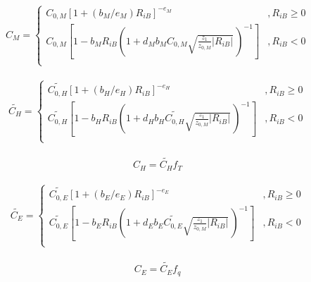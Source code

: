 \begin{eqnarray}
    C_M = \left\{
      \begin{array}{lr}
      C_{0,M} [ 1 + (b_M/e_M)  R_{iB} ]^{-e_M}
            &,
          R_{iB} \geq 0 \\
      C_{0,M} \left[ 1 - b_M R_{iB} \left( 1+ d_M b_M C_{0,M}
                                  \sqrt{\frac{z_1}{z_{0,M}}| R_{iB}|} \,
                                  \right)^{-1} \right]     
          &,
          R_{iB} < 0 \\
      \end{array} \right.
\end{eqnarray}

\begin{eqnarray}
    \widetilde{C_H} = \left\{
      \begin{array}{lr}
      \widetilde{C_{0,H}} [ 1 + (b_H/e_H) R_{iB} ]^{-e_H}
            &,
          R_{iB} \geq 0 \\
      \widetilde{C_{0,H}} \left[ 1 - b_H R_{iB}
                                  \left( 1+ d_H b_H \widetilde{C_{0,H}}
                                  \sqrt{\frac{z_1}{z_{0,M}}| R_{iB}|} \,
                                  \right)^{-1} \right]
             &,     
          R_{iB} < 0 \\
      \end{array} \right.
\end{eqnarray}

\begin{eqnarray}
    C_H = \widetilde{C_H} f_T
\end{eqnarray}

\begin{eqnarray}
    \widetilde{C_E} = \left\{
      \begin{array}{lr}
      \widetilde{C_{0,E}} [ 1 + (b_E/e_E) R_{iB} ]^{-e_E}
            &,
          R_{iB} \geq 0 \\
      \widetilde{C_{0,E}} \left[ 1 - b_E R_{iB}
                                  \left( 1+ d_E b_E \widetilde{C_{0,E}}
                                  \sqrt{\frac{z_1}{z_{0,M}}| R_{iB}|} \,
                                  \right)^{-1} \right]      
          &,
          R_{iB} < 0 \\
      \end{array} \right.
\end{eqnarray}

\begin{eqnarray}
    C_E = \widetilde{C_E} f_q
\end{eqnarray}

